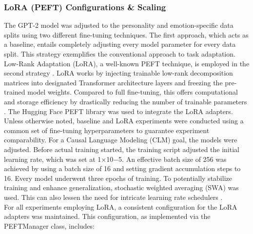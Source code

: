 \documentclass{DESSThesis}
\begin{document}
\subsubsection{LoRA (PEFT) Configurations \& Scaling}
The GPT-2 model was adjusted to the personality and emotion-specific data splits using two different fine-tuning techniques. The first approach, which acts as a baseline, entails completely adjusting every model parameter for every data split. This strategy exemplifies the conventional approach to task adaptation.
\\
Low-Rank Adaptation (LoRA), a well-known PEFT technique, is employed in the second strategy \cite{hu_lora_2021}. LoRA works by injecting trainable low-rank decomposition matrices into designated Transformer architecture layers and freezing the pre-trained model weights. Compared to full fine-tuning, this offers computational and storage efficiency by drastically reducing the number of trainable parameters \cite{houlsby_parameter-efficient_2019,lialin_scaling_2023}. The Hugging Face PEFT library was used to integrate the LoRA adapters.
\\
Unless otherwise noted, baseline and LoRA experiments were conducted using a common set of fine-tuning hyperparameters to guarantee experiment comparability. For a Causal Language Modeling (CLM) goal, the models were adjusted. Before actual training started, the training script adjusted the initial learning rate, which was set at 1×10−5. An effective batch size of 256 was achieved by using a batch size of 16 and setting gradient accumulation steps to 16. Every model underwent three epochs of training. To potentially stabilize training and enhance generalization, stochastic weighted averaging (SWA) was used. This can also lessen the need for intricate learning rate schedulers \cite{izmailov_averaging_2019}.
\\
For all experiments employing LoRA, a consistent configuration for the LoRA adapters was maintained. This configuration, as implemented via the PEFTManager class, includes:
\end{document}

